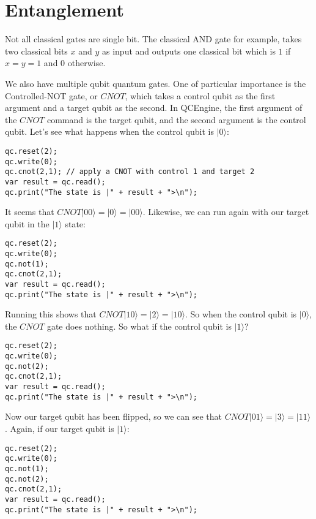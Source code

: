 \documentclass[twocolumn]{article}
\begin{document}
\section{Entanglement}
\label{sec:entanglement}

Not all classical gates are single bit. The classical AND gate for example, takes two classical bits $x$ and $y$ as input and outputs one classical bit which is $1$ if $x = y = 1$ and $0$ otherwise.

We also have multiple qubit quantum gates. One of particular importance is the Controlled-NOT gate, or $CNOT$, which takes a control qubit as the first argument and a target qubit as the second. In QCEngine, the first argument of the $CNOT$ command is the target qubit, and the second argument is the control qubit. Let's see what happens when the control qubit is $|0\rangle$:

\begin{lstlisting}
qc.reset(2);
qc.write(0);
qc.cnot(2,1); // apply a CNOT with control 1 and target 2
var result = qc.read();
qc.print("The state is |" + result + ">\n");
\end{lstlisting}

It seems that $CNOT|00\rangle = |0\rangle = |00\rangle$. Likewise, we can run again with our target qubit in the $|1\rangle$ state:

\begin{lstlisting}
qc.reset(2);
qc.write(0);
qc.not(1);
qc.cnot(2,1);
var result = qc.read();
qc.print("The state is |" + result + ">\n");
\end{lstlisting}

Running this shows that $CNOT|10\rangle = |2\rangle = |10\rangle$. So when the control qubit is $|0\rangle$, the $CNOT$ gate does nothing. So what if the control qubit is $|1\rangle$?

\begin{lstlisting}
qc.reset(2);
qc.write(0);
qc.not(2);
qc.cnot(2,1);
var result = qc.read();
qc.print("The state is |" + result + ">\n");
\end{lstlisting}

Now our target qubit has been flipped, so we can see that $CNOT|01\rangle = |3\rangle = |11\rangle$. Again, if our target qubit is $|1\rangle$:

\begin{lstlisting}
qc.reset(2);
qc.write(0);
qc.not(1);
qc.not(2);
qc.cnot(2,1);
var result = qc.read();
qc.print("The state is |" + result + ">\n");
\end{lstlisting}
\end{document}
